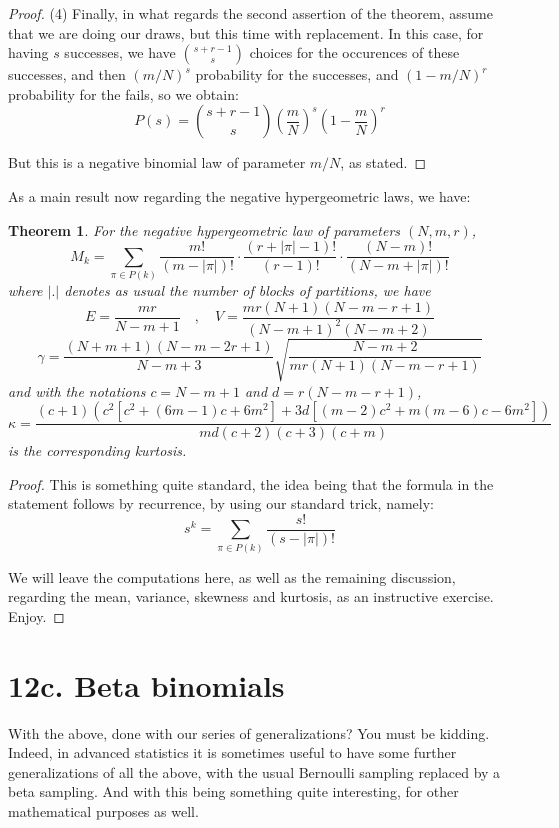 \documentclass[12pt]{amsbook}
\newtheorem{theorem}{Theorem}[chapter]
\begin{document}
\begin{proof}
(4) Finally, in what regards the second assertion of the theorem, assume that we are doing our draws, but this time with replacement. In this case, for having $s$ successes, we have $\binom{s+r-1}{s}$ choices for the occurences of these successes, and then $(m/N)^s$ probability for the successes, and $(1-m/N)^r$ probability for the fails, so we obtain:
$$P(s)=\binom{s+r-1}{s}\left(\frac{m}{N}\right)^s\left(1-\frac{m}{N}\right)^r$$

But this is a negative binomial law of parameter $m/N$, as stated.
\end{proof}

As a main result now regarding the negative hypergeometric laws, we have:

\begin{theorem}
For the negative hypergeometric law of parameters $(N,m,r)$,
$$M_k=\sum_{\pi\in P(k)}\frac{m!}{(m-|\pi|)!}\cdot\frac{(r+|\pi|-1)!}{(r-1)!}\cdot\frac{(N-m)!}{(N-m+|\pi|)!}$$
where $|.|$ denotes as usual the number of blocks of partitions, we have
$$E=\frac{mr}{N-m+1}\quad,\quad V=\frac{mr(N+1)(N-m-r+1)}{(N-m+1)^2(N-m+2)}$$
$$\gamma=\frac{(N+m+1)(N-m-2r+1)}{N-m+3}\sqrt{\frac{N-m+2}{mr(N+1)(N-m-r+1)}}$$
and with the notations $c=N-m+1$ and $d=r(N-m-r+1)$, 
$$\kappa=\frac{(c+1)(c^2[c^2+(6m-1)c+6m^2]+3d[(m-2)c^2+m(m-6)c-6m^2])}{md(c+2)(c+3)(c+m)}$$
is the corresponding kurtosis.
\end{theorem}

\begin{proof}
This is something quite standard, the idea being that the formula in the statement follows by recurrence, by using our standard trick, namely: 
$$s^k=\sum_{\pi\in P(k)}\frac{s!}{(s-|\pi|)!}$$

We will leave the computations here, as well as the remaining discussion, regarding the mean, variance, skewness and kurtosis, as an instructive exercise. Enjoy.
\end{proof}

\section*{12c. Beta binomials}

With the above, done with our series of generalizations? You must be kidding. Indeed, in advanced statistics it is sometimes useful to have some further generalizations of all the above, with the usual Bernoulli sampling replaced by a beta sampling. And with this being  something quite interesting, for other mathematical purposes as well.
\end{document}
